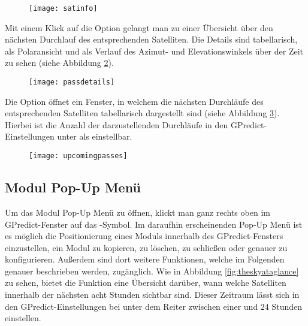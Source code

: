 
\begin{figure}[h]
	\centering
	\texttt{[image: satinfo]}
	\caption{}
	\label{fig:satinfo} 
\end{figure}

Mit einem Klick auf die Option  gelangt man zu einer Übersicht über den nächsten Durchlauf des entsprechenden Satelliten. Die Details sind tabellarisch, als Polaransicht und als Verlauf des Azimut- und Elevationswinkels über der Zeit zu sehen (siehe Abbildung \ref{fig:passdetails}).

\begin{figure}[h]
	\centering
	\texttt{[image: passdetails]}
	\caption{}
	\label{fig:passdetails} 
\end{figure}

\clearpage

Die Option  öffnet ein Fenster, in welchem die nächsten Durchläufe des entsprechenden Satelliten tabellarisch dargestellt sind (siehe Abbildung \ref{fig:upcomingpasses}). Hierbei ist die Anzahl der darzustellenden Durchläufe in den GPredict-Einstellungen unter  als  einstellbar.

\begin{figure}[h]
	\centering
	\texttt{[image: upcomingpasses]}
	\caption{}
	\label{fig:upcomingpasses} 
\end{figure}

\vspace{-0.5em}

\subsection{Modul Pop-Up Menü}

Um das Modul Pop-Up Menü zu öffnen, klickt man ganz rechts oben im GPredict-Fenster auf das \myvsymbol-Symbol. Im daraufhin erscheinenden Pop-Up Menü ist es möglich die Positionierung eines Moduls innerhalb des GPredict-Fensters einzustellen, ein Modul zu kopieren, zu löschen, zu schließen oder genauer zu konfigurieren. Außerdem sind dort weitere Funktionen, welche im Folgenden genauer beschrieben werden, zugänglich.\newpar
Wie in Abbildung \ref{fig:theskyataglance} zu sehen, bietet die Funktion  eine Übersicht darüber, wann welche Satelliten innerhalb der nächsten acht Stunden sichtbar sind. Dieser Zeitraum lässt sich in den GPredict-Einstellungen bei  unter dem Reiter  zwischen einer und 24 Stunden einstellen.

